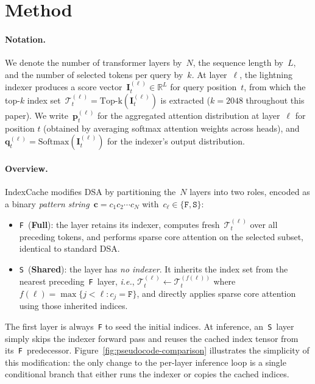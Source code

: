 \section{Method}
\label{sec:method}

\paragraph{Notation.}
We denote the number of transformer layers by~$N$, the sequence length by~$L$, and the number of selected tokens per query by~$k$.
At layer~$\ell$, the lightning indexer produces a score vector~$\mathbf{I}^{(\ell)}_{t} \in \mathbb{R}^{L}$ for query position~$t$, from which the top-$k$ index set~$\mathcal{T}^{(\ell)}_t = \mathrm{Top\text{-}k}(\mathbf{I}^{(\ell)}_t)$ is extracted ($k=2048$ throughout this paper).
We write~$\mathbf{p}^{(\ell)}_{t}$ for the aggregated attention distribution at layer~$\ell$ for position $t$ (obtained by averaging softmax attention weights across heads), and~$\mathbf{q}^{(\ell)}_t = \mathrm{Softmax}(\mathbf{I}^{(\ell)}_t)$ for the indexer's output distribution.

\paragraph{Overview.}
IndexCache modifies DSA by partitioning the~$N$ layers into two roles, encoded as a binary \emph{pattern string}~$\mathbf{c} = c_1 c_2 \cdots c_N$ with~$c_\ell \in \{\texttt{F}, \texttt{S}\}$:
\begin{itemize}[leftmargin=*,itemsep=2pt]
    \item \texttt{F}~(\textbf{Full}): the layer retains its indexer, computes fresh~$\mathcal{T}^{(\ell)}_t$ over all preceding tokens, and performs sparse core attention on the selected subset, identical to standard DSA.
    \item \texttt{S}~(\textbf{Shared}): the layer has \emph{no indexer}. It inherits the index set from the nearest preceding~\texttt{F}~layer, \emph{i.e.}\@\xspace, $\mathcal{T}^{(\ell)}_t \leftarrow \mathcal{T}^{(f(\ell))}_t$ where~$f(\ell) = \max\{j < \ell : c_j = \texttt{F}\}$, and directly applies sparse core attention using those inherited indices.
\end{itemize}
The first layer is always~\texttt{F} to seed the initial indices.
At inference, an~\texttt{S}~layer simply skips the indexer forward pass and reuses the cached index tensor from its~\texttt{F}~predecessor.
Figure~\ref{fig:pseudocode-comparison} illustrates the simplicity of this modification: the only change to the per-layer inference loop is a single conditional branch that either runs the indexer or copies the cached indices.

